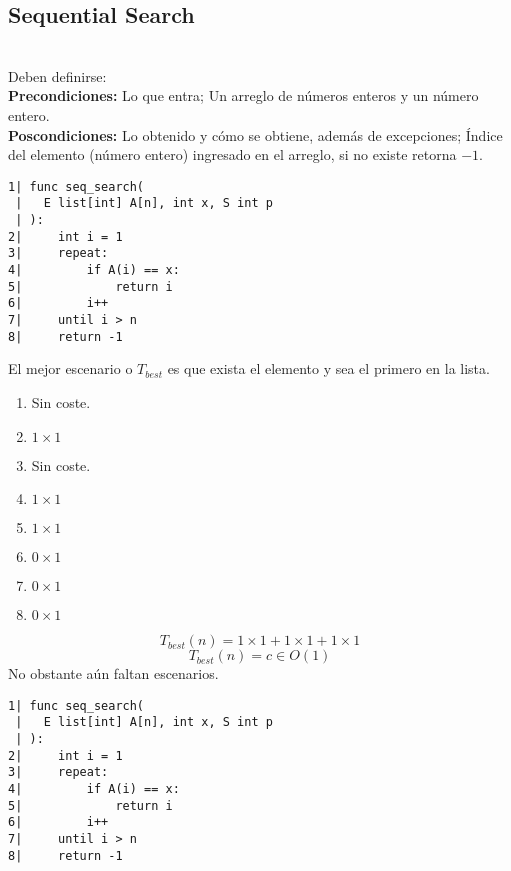 \subsection{Sequential Search}
\begin{example}~
	\\Deben definirse:
	\\\textbf{Precondiciones:} Lo que entra; Un arreglo de números enteros y un número entero.
	\\\textbf{Poscondiciones:} Lo obtenido y cómo se obtiene, además de excepciones; Índice del elemento (número entero) ingresado en el arreglo, si no existe retorna $-1$.

	\begin{multicols}{2}
		\begin{lstlisting}
1| func seq_search(
 |   E list[int] A[n], int x, S int p
 | ):
2|     int i = 1
3|     repeat:
4|         if A(i) == x:
5|             return i
6|         i++
7|     until i > n
8|     return -1
        \end{lstlisting}

		\columnbreak
		El mejor escenario o $T_{best}$ es que exista el elemento y sea el primero en la lista.
		\begin{enumerate}
			\item Sin coste.
			\item $1\times1$
			\item Sin coste.
			\item $1\times1$
			\item $1\times1$
			\item $0\times1$
			\item $0\times1$
			\item $0\times1$
		\end{enumerate}
	\end{multicols}

	$$
		T_{best}(n)=1\times1+1\times1+1\times1
	$$ $$
		T_{best}(n)=c\in O(1)
	$$
	No obstante aún faltan escenarios.
	\begin{multicols}{2}
		\begin{lstlisting}
1| func seq_search(
 |   E list[int] A[n], int x, S int p
 | ):
2|     int i = 1
3|     repeat:
4|         if A(i) == x:
5|             return i
6|         i++
7|     until i > n
8|     return -1
        \end{lstlisting}


\end{multicols}
\end{example}
